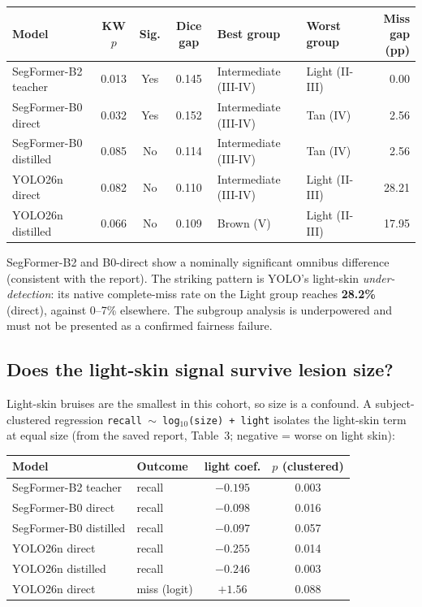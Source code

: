\documentclass[11pt]{article}
\begin{document}
\begin{center}
\begin{tabular}{l c c c l l R}
\toprule
Model & KW $p$ & Sig. & Dice gap & Best group & Worst group & Miss gap (pp) \\
\midrule
SegFormer-B2 teacher   & 0.013 & Yes & 0.145 & Intermediate (III-IV) & Light (II-III) & 0.00 \\
SegFormer-B0 direct    & 0.032 & Yes & 0.152 & Intermediate (III-IV) & Tan (IV)       & 2.56 \\
SegFormer-B0 distilled & 0.085 & No  & 0.114 & Intermediate (III-IV) & Tan (IV)       & 2.56 \\
YOLO26n direct         & 0.082 & No  & 0.110 & Intermediate (III-IV) & Light (II-III) & 28.21 \\
YOLO26n distilled      & 0.066 & No  & 0.109 & Brown (V)             & Light (II-III) & 17.95 \\
\bottomrule
\end{tabular}
\end{center}

SegFormer-B2 and B0-direct show a nominally significant omnibus difference (consistent
with the report). The striking pattern is YOLO's light-skin \emph{under-detection}: its
native complete-miss rate on the Light group reaches \textbf{28.2\%} (direct), against
0--7\% elsewhere. The subgroup analysis is underpowered and must not be presented as a
confirmed fairness failure.

\subsection*{Does the light-skin signal survive lesion size?}

Light-skin bruises are the smallest in this cohort, so size is a confound. A
subject-clustered regression \texttt{recall $\sim$ log$_{10}$(size) + light} isolates the
light-skin term at equal size (from the saved report, Table~3; negative = worse on light
skin):

\begin{center}
\begin{tabular}{l l c c}
\toprule
Model & Outcome & light coef. & $p$ (clustered) \\
\midrule
SegFormer-B2 teacher   & recall        & $-0.195$ & 0.003 \\
SegFormer-B0 direct    & recall        & $-0.098$ & 0.016 \\
SegFormer-B0 distilled & recall        & $-0.097$ & 0.057 \\
YOLO26n direct         & recall        & $-0.255$ & 0.014 \\
YOLO26n distilled      & recall        & $-0.246$ & 0.003 \\
YOLO26n direct         & miss (logit)  & $+1.56$  & 0.088 \\
\bottomrule
\end{tabular}
\end{center}
\end{document}
